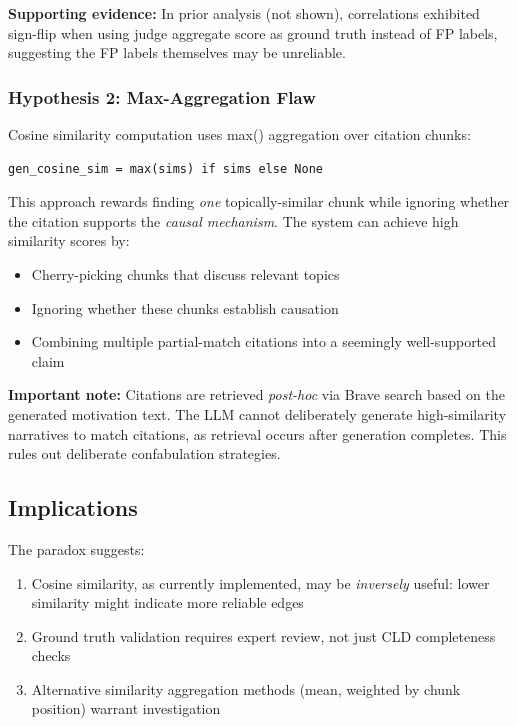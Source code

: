 \textbf{Supporting evidence:} In prior analysis (not shown), correlations exhibited sign-flip when using judge aggregate score as ground truth instead of FP labels, suggesting the FP labels themselves may be unreliable.

\subsubsection{Hypothesis 2: Max-Aggregation Flaw}

Cosine similarity computation uses max() aggregation over citation chunks:

\begin{verbatim}
gen_cosine_sim = max(sims) if sims else None
\end{verbatim}

This approach rewards finding \textit{one} topically-similar chunk while ignoring whether the citation supports the \textit{causal mechanism}. The system can achieve high similarity scores by:

\begin{itemize}
    \item Cherry-picking chunks that discuss relevant topics
    \item Ignoring whether these chunks establish causation
    \item Combining multiple partial-match citations into a seemingly well-supported claim
\end{itemize}

\textbf{Important note:} Citations are retrieved \textit{post-hoc} via Brave search based on the generated motivation text. The LLM cannot deliberately generate high-similarity narratives to match citations, as retrieval occurs after generation completes. This rules out deliberate confabulation strategies.

\subsection{Implications}

The paradox suggests:
\begin{enumerate}
    \item Cosine similarity, as currently implemented, may be \textit{inversely} useful: lower similarity might indicate more reliable edges
    \item Ground truth validation requires expert review, not just CLD completeness checks
    \item Alternative similarity aggregation methods (mean, weighted by chunk position) warrant investigation
\end{enumerate}

